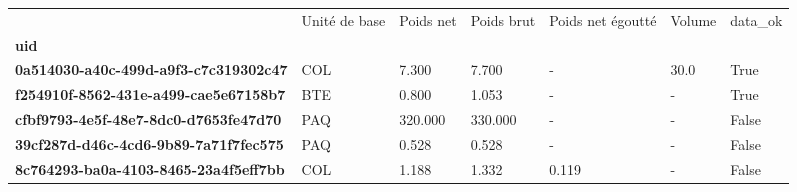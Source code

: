 \begin{tabularx}{\linewidth}{lXXXXXX}
\toprule
{} & Unité de base &  Poids net &  Poids brut &  Poids net égoutté &  Volume &  data\_ok \\
\textbf{uid                                 } &               &            &             &                    &         &          \\
\midrule
\textbf{0a514030-a40c-499d-a9f3-c7c319302c47} &           COL &      7.300 &       7.700 &                  - &    30.0 &     True \\
\textbf{f254910f-8562-431e-a499-cae5e67158b7} &           BTE &      0.800 &       1.053 &                  - &       - &     True \\
\textbf{cfbf9793-4e5f-48e7-8dc0-d7653fe47d70} &           PAQ &    320.000 &     330.000 &                  - &       - &    False \\
\textbf{39cf287d-d46c-4cd6-9b89-7a71f7fec575} &           PAQ &      0.528 &       0.528 &                  - &       - &    False \\
\textbf{8c764293-ba0a-4103-8465-23a4f5eff7bb} &           COL &      1.188 &       1.332 &              0.119 &       - &    False \\
\bottomrule
\end{tabularx}
